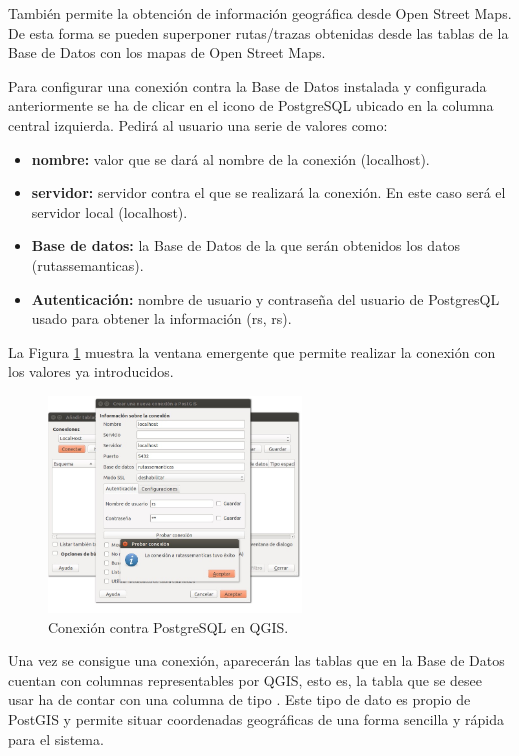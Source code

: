 También permite la obtención de información geográfica desde Open Street Maps. De esta forma se pueden superponer rutas/trazas obtenidas desde las tablas de la Base de Datos con los mapas de Open Street Maps.

Para configurar una conexión contra la Base de Datos instalada y configurada anteriormente se ha de clicar en el icono de PostgreSQL ubicado en la columna central izquierda. Pedirá al usuario una serie de valores como:

\begin{itemize}
\item \textbf{nombre:} valor que se dará al nombre de la conexión (localhost).
\item \textbf{servidor:} servidor contra el que se realizará la conexión. En este caso será el servidor local (localhost).
\item \textbf{Base de datos:} la Base de Datos de la que serán obtenidos los datos (rutassemanticas).
\item \textbf{Autenticación:} nombre de usuario y contraseña  del usuario de PostgresQL usado para obtener la información (rs, rs).
\end{itemize}

La Figura \ref{conexionqgis} muestra la ventana emergente que permite realizar la conexión con los valores ya introducidos.

\begin{figure}[h]
  \centering
    \includegraphics[width=0.6\textwidth]{../img/qgis/conexionqgis.jpg}
  \caption{Conexión contra PostgreSQL en QGIS.}
  \label{conexionqgis}
\end{figure}

Una vez se consigue una conexión, aparecerán las tablas que en la Base de Datos cuentan con columnas representables por QGIS, esto es, la tabla que se desee usar ha de contar con una columna de tipo . Este tipo de dato es propio de PostGIS y permite situar coordenadas geográficas de una forma sencilla y rápida para el sistema.

